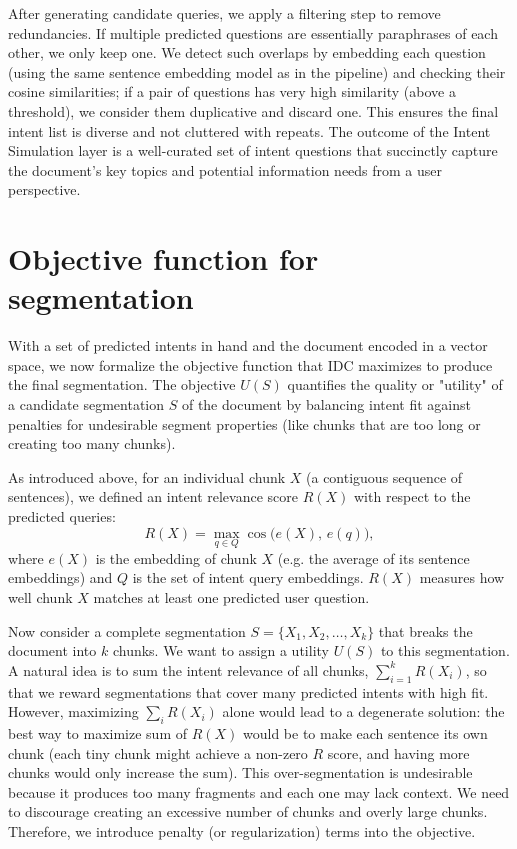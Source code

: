 \documentclass[12pt,a4paper]{report}
\begin{document}
After generating candidate queries, we apply a filtering step to remove redundancies. If multiple predicted questions are essentially paraphrases of each other, we only keep one. We detect such overlaps by embedding each question (using the same sentence embedding model as in the pipeline) and checking their cosine similarities; if a pair of questions has very high similarity (above a threshold), we consider them duplicative and discard one. This ensures the final intent list is diverse and not cluttered with repeats. The outcome of the Intent Simulation layer is a well-curated set of intent questions that succinctly capture the document's key topics and potential information needs from a user perspective.

\section{Objective function for segmentation}

With a set of predicted intents in hand and the document encoded in a vector space, we now formalize the objective function that IDC maximizes to produce the final segmentation. The objective $U(S)$ quantifies the quality or "utility" of a candidate segmentation $S$ of the document by balancing intent fit against penalties for undesirable segment properties (like chunks that are too long or creating too many chunks).

As introduced above, for an individual chunk $X$ (a contiguous sequence of sentences), we defined an intent relevance score $R(X)$ with respect to the predicted queries:
\[ 
    R(X) = \max_{q \in Q} \cos\!\big(e(X),\, e(q)\big),
\] 
where $e(X)$ is the embedding of chunk $X$ (e.g. the average of its sentence embeddings) and $Q$ is the set of intent query embeddings. $R(X)$ measures how well chunk $X$ matches at least one predicted user question.

Now consider a complete segmentation $S = \{X_1, X_2, \dots, X_k\}$ that breaks the document into $k$ chunks. We want to assign a utility $U(S)$ to this segmentation. A natural idea is to sum the intent relevance of all chunks, $\sum_{i=1}^k R(X_i)$, so that we reward segmentations that cover many predicted intents with high fit. However, maximizing $\sum_i R(X_i)$ alone would lead to a degenerate solution: the best way to maximize sum of $R(X)$ would be to make each sentence its own chunk (each tiny chunk might achieve a non-zero $R$ score, and having more chunks would only increase the sum). This over-segmentation is undesirable because it produces too many fragments and each one may lack context. We need to discourage creating an excessive number of chunks and overly large chunks. Therefore, we introduce penalty (or regularization) terms into the objective.
\end{document}

